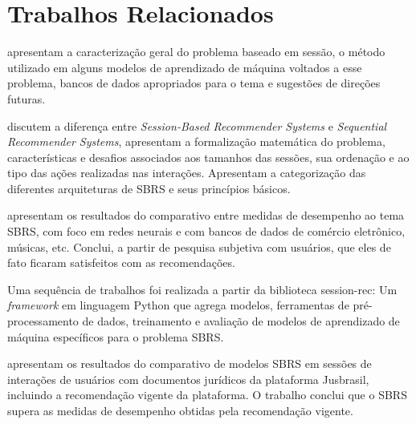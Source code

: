 \section{Trabalhos Relacionados}
\citet{rec_sys_handbook_2022} apresentam a caracterização geral do problema
baseado em sessão, o método utilizado em alguns modelos de aprendizado de
máquina voltados a esse problema, bancos de dados apropriados para o tema e
sugestões de direções futuras.

\citet{survey_wang_2021} discutem a diferença entre \textit{Session-Based Recommender Systems}
e \textit{Sequential Recommender Systems}, apresentam a formalização matemática
do problema, características e desafios associados aos tamanhos das sessões, sua
ordenação e ao tipo das ações realizadas nas interações. Apresentam a
categorização das diferentes arquiteturas de SBRS e seus princípios básicos.

\citet{ludewig2021empirical} apresentam os resultados do comparativo entre
medidas de desempenho ao tema SBRS, com foco em redes neurais e com bancos de
dados de comércio eletrônico, músicas, etc. Conclui, a partir de pesquisa subjetiva
com usuários, que eles de fato ficaram satisfeitos com as recomendações.

Uma sequência de trabalhos
\cite{LATIFI_2021,ludewig2021empirical,ludewig_2018,ludewig_2019,sessionrec} foi
realizada a partir da biblioteca session-rec: Um \textit{framework} em linguagem
Python que agrega modelos, ferramentas de pré-processamento de dados,
treinamento e avaliação de modelos de aprendizado de máquina específicos para o
problema SBRS.

 \citet{jusbrasil2022} apresentam os resultados do comparativo de modelos SBRS em
sessões de interações de usuários com documentos jurídicos da plataforma
Jusbrasil, incluindo a recomendação vigente da plataforma. O trabalho
conclui que o SBRS supera as medidas de desempenho obtidas pela recomendação
vigente.